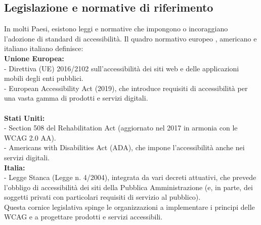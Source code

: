 \documentclass[14pt]{extbook}
\begin{document}
\subsection{Legislazione e normative di riferimento}
In molti Paesi, esistono leggi e normative che impongono o incoraggiano l’adozione di standard di accessibilità. Il quadro normativo europeo \cite{eu2016_2102}, americano \cite{section508_1998} e italiano italiano \cite{legge_stanca_2004} definisce:\\

\textbf{Unione Europea:}\\
- Direttiva (UE) 2016/2102 sull’accessibilità dei siti web e delle applicazioni mobili degli enti pubblici.\\
- European Accessibility Act (2019), che introduce requisiti di accessibilità per una vasta gamma di prodotti e servizi digitali.\\\\

\textbf{Stati Uniti:}\\
- Section 508 del Rehabilitation Act (aggiornato nel 2017 in armonia con le WCAG 2.0 AA).\\
- Americans with Disabilities Act (ADA), che impone l’accessibilità anche nei servizi digitali.\\

\textbf{Italia:}\\
- Legge Stanca (Legge n. 4/2004), integrata da vari decreti attuativi, che prevede l’obbligo di accessibilità dei siti della Pubblica Amministrazione (e, in parte, dei soggetti privati con particolari requisiti di servizio al pubblico).\\

Questa cornice legislativa spinge le organizzazioni a implementare i principi delle WCAG e a progettare prodotti e servizi accessibili.\\
\end{document}
